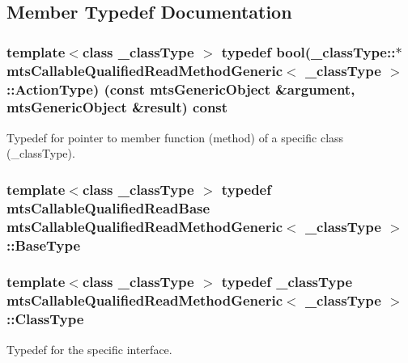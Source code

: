 \subsection{Member Typedef Documentation}
\hypertarget{classmts_callable_qualified_read_method_generic_afe3373d95d9a97f9737078e041f945d8}{}
\subsubsection[{Action\+Type}]{\setlength{\rightskip}{0pt plus 5cm}template$<$class \+\_\+class\+Type $>$ typedef bool(\+\_\+class\+Type\+::$\ast$ {\bf mts\+Callable\+Qualified\+Read\+Method\+Generic}$<$ \+\_\+class\+Type $>$\+::Action\+Type) (const {\bf mts\+Generic\+Object} \&argument, {\bf mts\+Generic\+Object} \&result) const }\label{classmts_callable_qualified_read_method_generic_afe3373d95d9a97f9737078e041f945d8}
Typedef for pointer to member function (method) of a specific class (\+\_\+class\+Type). \hypertarget{classmts_callable_qualified_read_method_generic_a773d5a3d8a4847835a36aa9ccfb93774}{}
\subsubsection[{Base\+Type}]{\setlength{\rightskip}{0pt plus 5cm}template$<$class \+\_\+class\+Type $>$ typedef {\bf mts\+Callable\+Qualified\+Read\+Base} {\bf mts\+Callable\+Qualified\+Read\+Method\+Generic}$<$ \+\_\+class\+Type $>$\+::{\bf Base\+Type}}\label{classmts_callable_qualified_read_method_generic_a773d5a3d8a4847835a36aa9ccfb93774}
\hypertarget{classmts_callable_qualified_read_method_generic_ada2d394b00a2db849dd5d67b965fd63b}{}
\subsubsection[{Class\+Type}]{\setlength{\rightskip}{0pt plus 5cm}template$<$class \+\_\+class\+Type $>$ typedef \+\_\+class\+Type {\bf mts\+Callable\+Qualified\+Read\+Method\+Generic}$<$ \+\_\+class\+Type $>$\+::{\bf Class\+Type}}\label{classmts_callable_qualified_read_method_generic_ada2d394b00a2db849dd5d67b965fd63b}
Typedef for the specific interface. \hypertarget{classmts_callable_qualified_read_method_generic_ae4d162ce942aeab0d486d2aa8f001a39}{}
